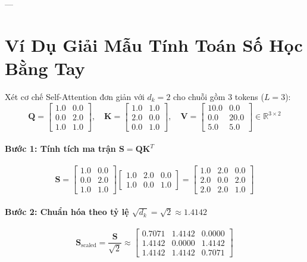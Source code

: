 ---

\section{Ví Dụ Giải Mẫu Tính Toán Số Học Bằng Tay}
\label{sec:ch06-numerical-walkthrough}

\begin{example}
Xét cơ chế Self-Attention đơn giản với $d_k = 2$ cho chuỗi gồm 3 tokens ($L=3$):
\begin{equation*}
\mathbf{Q} = \begin{bmatrix} 1.0 & 0.0 \\ 0.0 & 2.0 \\ 1.0 & 1.0 \end{bmatrix}, \quad
\mathbf{K} = \begin{bmatrix} 1.0 & 1.0 \\ 2.0 & 0.0 \\ 0.0 & 1.0 \end{bmatrix}, \quad
\mathbf{V} = \begin{bmatrix} 10.0 & 0.0 \\ 0.0 & 20.0 \\ 5.0 & 5.0 \end{bmatrix} \in \mathbb{R}^{3 \times 2}
\end{equation*}

\paragraph{Bước 1: Tính tích ma trận $\mathbf{S} = \mathbf{Q} \mathbf{K}^T$}
\begin{equation*}
\mathbf{S} = \begin{bmatrix} 1.0 & 0.0 \\ 0.0 & 2.0 \\ 1.0 & 1.0 \end{bmatrix} \begin{bmatrix} 1.0 & 2.0 & 0.0 \\ 1.0 & 0.0 & 1.0 \end{bmatrix} = \begin{bmatrix} 1.0 & 2.0 & 0.0 \\ 2.0 & 0.0 & 2.0 \\ 2.0 & 2.0 & 1.0 \end{bmatrix}
\end{equation*}

\paragraph{Bước 2: Chuẩn hóa theo tỷ lệ $\sqrt{d_k} = \sqrt{2} \approx 1.4142$}
\begin{equation*}
\mathbf{S}_{\text{scaled}} = \frac{\mathbf{S}}{\sqrt{2}} \approx \begin{bmatrix} 0.7071 & 1.4142 & 0.0000 \\ 1.4142 & 0.0000 & 1.4142 \\ 1.4142 & 1.4142 & 0.7071 \end{bmatrix}
\end{equation*}


\end{example}
